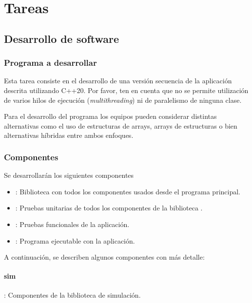 \section{Tareas}

\subsection{Desarrollo de software}

\subsubsection{Programa a desarrollar}

Esta tarea consiste en el desarrollo de una versión secuencia de la aplicación
descrita utilizando C++20. Por favor, ten en cuenta que no se permite
utilización de varios hilos de ejecución (\emph{multithreading}) ni de
paralelismo de ninguna clase.

Para el desarrollo del programa los equipos pueden considerar distintas
alternativas como el uso de estructuras de arrays, arrays de estructuras o bien
alternativas híbridas entre ambos enfoques.

\subsubsection{Componentes}

Se desarrollarán los siguientes componentes

\begin{itemize}
  \item {}: 
        Biblioteca con todos los componentes usados desde el programa principal.

  \item {}: 
        Pruebas unitarias de todos los componentes de la biblioteca .

  \item {}:
        Pruebas funcionales de la aplicación.

  \item {}: 
        Programa ejecutable con la aplicación.

\end{itemize}

A continuación, se describen algunos componentes con más detalle:

\paragraph{sim}: Componentes de la biblioteca de simulación.


